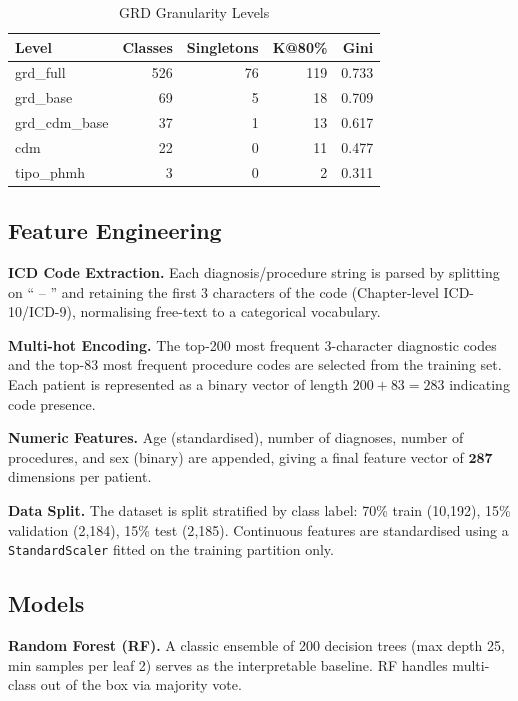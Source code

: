 \documentclass{IEEEtran}
\begin{document}
\begin{table}[H]
  \centering
  \caption{GRD Granularity Levels}
  \label{tab:granularity}
  \begin{tabular}{lrrrr}
    \toprule
    Level & Classes & Singletons & K@80\% & Gini \\
    \midrule
    grd\_full  & 526 & 76 & 119 & 0.733 \\
    grd\_base  & 69  & 5  & 18  & 0.709 \\
    grd\_cdm\_base & 37 & 1 & 13 & 0.617 \\
    cdm        & 22  & 0  & 11  & 0.477 \\
    tipo\_phmh & 3   & 0  & 2   & 0.311 \\
    \bottomrule
  \end{tabular}
\end{table}

\subsection{Feature Engineering}

\textbf{ICD Code Extraction.}
Each diagnosis/procedure string is parsed by splitting on
`` – '' and retaining the first 3 characters of the code
(Chapter-level ICD-10/ICD-9), normalising free-text to a
categorical vocabulary.

\textbf{Multi-hot Encoding.}
The top-200 most frequent 3-character diagnostic codes and the top-83
most frequent procedure codes are selected from the training set.
Each patient is represented as a binary vector of length $200+83=283$
indicating code presence.

\textbf{Numeric Features.}
Age (standardised), number of diagnoses, number of procedures, and
sex (binary) are appended, giving a final feature vector of
$\mathbf{287}$ dimensions per patient.

\textbf{Data Split.}
The dataset is split stratified by class label:
70\% train (10{,}192), 15\% validation (2{,}184), 15\% test (2{,}185).
Continuous features are standardised using a
\texttt{StandardScaler} fitted on the training partition only.

\subsection{Models}

\textbf{Random Forest (RF).}  A classic ensemble of 200 decision
trees (max depth 25, min samples per leaf 2) serves as the
interpretable baseline.  RF handles multi-class out of the box
via majority vote.
\end{document}
